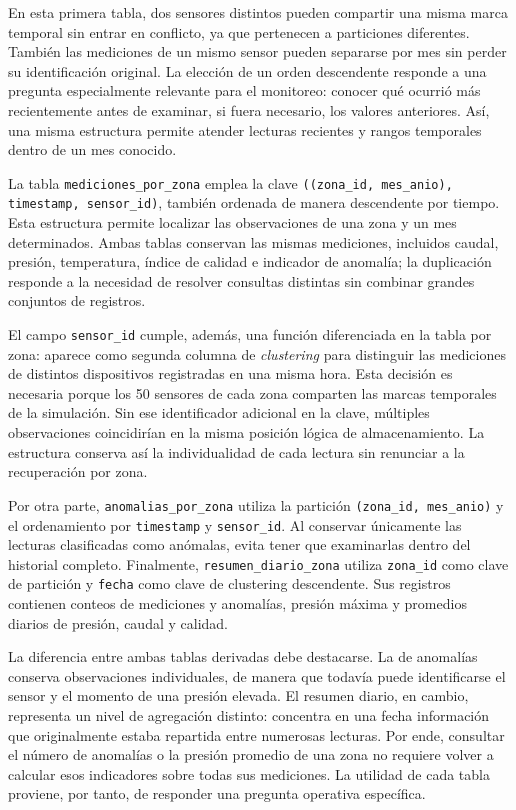 \documentclass[conference]{IEEEtran}
\begin{document}
En esta primera tabla, dos sensores distintos pueden compartir una misma marca temporal sin entrar en conflicto, ya que pertenecen a particiones diferentes. También las mediciones de un mismo sensor pueden separarse por mes sin perder su identificación original. La elección de un orden descendente responde a una pregunta especialmente relevante para el monitoreo: conocer qué ocurrió más recientemente antes de examinar, si fuera necesario, los valores anteriores. Así, una misma estructura permite atender lecturas recientes y rangos temporales dentro de un mes conocido.

La tabla \texttt{mediciones\_por\_zona} emplea la clave \texttt{((zona\_id, mes\_anio), timestamp, sensor\_id)}, también ordenada de manera descendente por tiempo. Esta estructura permite localizar las observaciones de una zona y un mes determinados. Ambas tablas conservan las mismas mediciones, incluidos caudal, presión, temperatura, índice de calidad e indicador de anomalía; la duplicación responde a la necesidad de resolver consultas distintas sin combinar grandes conjuntos de registros.

El campo \texttt{sensor\_id} cumple, además, una función diferenciada en la tabla por zona: aparece como segunda columna de \textit{clustering} para distinguir las mediciones de distintos dispositivos registradas en una misma hora. Esta decisión es necesaria porque los 50 sensores de cada zona comparten las marcas temporales de la simulación. Sin ese identificador adicional en la clave, múltiples observaciones coincidirían en la misma posición lógica de almacenamiento. La estructura conserva así la individualidad de cada lectura sin renunciar a la recuperación por zona.

Por otra parte, \texttt{anomalias\_por\_zona} utiliza la partición \texttt{(zona\_id, mes\_anio)} y el ordenamiento por \texttt{timestamp} y \texttt{sensor\_id}. Al conservar únicamente las lecturas clasificadas como anómalas, evita tener que examinarlas dentro del historial completo. Finalmente, \texttt{resumen\_diario\_zona} utiliza \texttt{zona\_id} como clave de partición y \texttt{fecha} como clave de clustering descendente. Sus registros contienen conteos de mediciones y anomalías, presión máxima y promedios diarios de presión, caudal y calidad.

La diferencia entre ambas tablas derivadas debe destacarse. La de anomalías conserva observaciones individuales, de manera que todavía puede identificarse el sensor y el momento de una presión elevada. El resumen diario, en cambio, representa un nivel de agregación distinto: concentra en una fecha información que originalmente estaba repartida entre numerosas lecturas. Por ende, consultar el número de anomalías o la presión promedio de una zona no requiere volver a calcular esos indicadores sobre todas sus mediciones. La utilidad de cada tabla proviene, por tanto, de responder una pregunta operativa específica.
\end{document}
